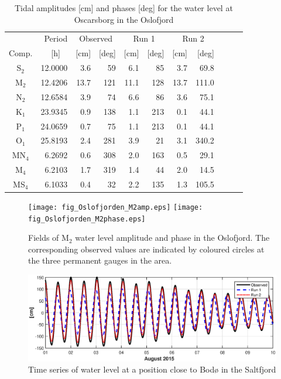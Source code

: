 \begin{table}[ht]
\caption{Tidal amplitudes [cm] and phases [deg] for the water level at Oscarsborg in the Oslofjord}
\label{tab:Oscarsborg}
\centering
\begin{tabular}{crrrrrrrrrr} \hline
      & Period & \multicolumn{2}{c}{Observed} & \multicolumn{2}{c}{Run 1} & \multicolumn{2}{c}{Run 2}  \\
Comp. & [h] $\;\;$ & [cm] & [deg] & [cm] & [deg] & [cm] & [deg]  \\ \hline 
S$_2$  & 12.0000 &  3.6 &  59  &   6.1 &  85  &  3.7 &  69.8  \\
M$_2$  & 12.4206 & 13.7 & 121  &  11.1 & 128  & 13.7 & 111.0  \\
N$_2$  & 12.6584 &  3.9 &  74  &   6.6 &  86  &  3.6 &  75.1  \\
K$_1$  & 23.9345 &  0.9 & 138  &   1.1 & 213  &  0.1 &  44.1  \\
P$_1$  & 24.0659 &  0.7 &  75  &   1.1 & 213  &  0.1 &  44.1  \\
O$_1$  & 25.8193 &  2.4 & 281  &   3.9 &  21  &  3.1 & 340.2  \\
MN$_4$ &  6.2692 &  0.6 & 308  &   2.0 & 163  &  0.5 &  29.1  \\
M$_4$  &  6.2103 &  1.7 & 319  &   1.4 &  44  &  2.0 &  14.5  \\
MS$_4$ &  6.1033 &  0.4 &  32  &   2.2 & 135  &  1.3 & 105.5  \\ \hline 
\end{tabular}
\end{table}




\begin{figure}[!t]
\centering
\texttt{[image: fig\_Oslofjorden\_M2amp.eps]}
\texttt{[image: fig\_Oslofjorden\_M2phase.eps]}
\caption{Fields of M$_2$ water level amplitude and phase in the Oslofjord. The corresponding observed values are indicated by coloured circles at the three permanent gauges in the area.}
\label{fig:Oslofjord_tidal_fields}
\end{figure}


\begin{figure}[!t]
\centering
\includegraphics[width=\textwidth]{fig_Saltstraumen_timeseries}
\caption{Time series of water level at a position close to Bod{\o} in the Saltfjord}
\label{fig:Saltstraumen_timeseries}
\end{figure}



